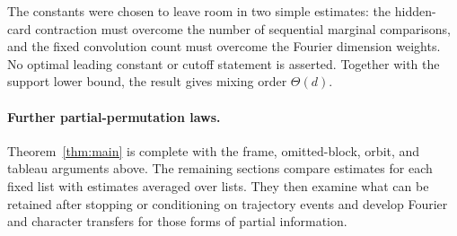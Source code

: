 The constants were chosen to leave room in two simple estimates: the
hidden-card contraction must overcome the number of sequential marginal
comparisons, and the fixed convolution count must overcome the Fourier
dimension weights. No optimal leading constant or cutoff statement is
asserted. Together with the support lower bound, the result gives
mixing order $\Theta(d)$.

\paragraph{Further partial-permutation laws.}
Theorem~\ref{thm:main} is complete with the frame, omitted-block, orbit,
and tableau arguments above. The remaining sections compare estimates for
each fixed list with estimates averaged over lists. They then examine what
can be retained after stopping or conditioning on trajectory events and
develop Fourier and character transfers for those forms of partial
information.
